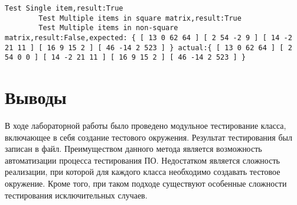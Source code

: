 \documentclass[a4paper,14pt]{extarticle}
\begin{document}
    \begin{lstlisting}[language={[Sharp]C}]
        Test Single item,result:True
        Test Multiple items in square matrix,result:True
        Test Multiple items in non-square matrix,result:False,expected: { [ 13 0 62 64 ] [ 2 54 -2 9 ] [ 14 -2 21 11 ] [ 16 9 15 2 ] [ 46 -14 2 523 ] } actual:{ [ 13 0 62 64 ] [ 2 54 0 0 ] [ 14 -2 21 11 ] [ 16 9 15 2 ] [ 46 -14 2 523 ] }
    \end{lstlisting}

    \section{Выводы}

    В ходе лабораторной работы было проведено модульное тестирование класса,
    включающее в себя создание тестового окружения. Результат тестирования был
    записан в файл. Преимуществом данного метода является возможность автоматизации
    процесса тестирования ПО. Недостатком является сложность реализации, при которой
    для каждого класса необходимо создавать тестовое окружение. Кроме того,
    при таком подходе существуют особенные сложности тестирования исключительных 
    случаев. 
\end{document}
